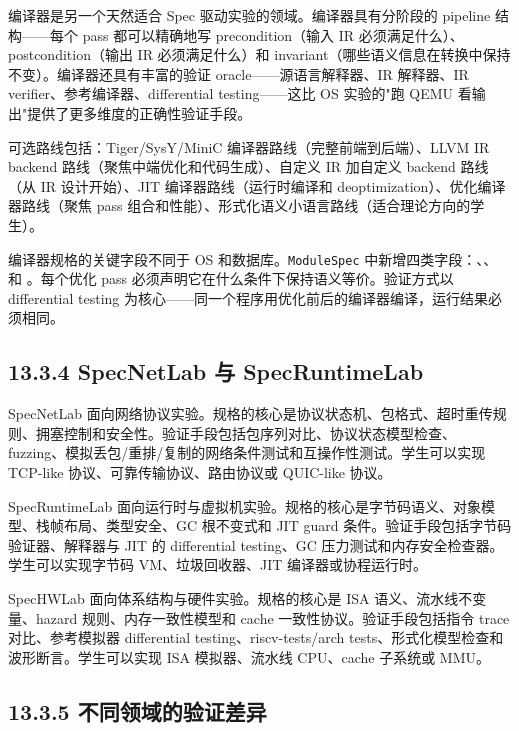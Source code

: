 \documentclass[UTF8,a4paper,12pt,openany]{ctexrep}
\begin{document}
编译器是另一个天然适合 Spec 驱动实验的领域。编译器具有分阶段的 pipeline 结构------每个 pass 都可以精确地写 precondition（输入 IR 必须满足什么）、postcondition（输出 IR 必须满足什么）和 invariant（哪些语义信息在转换中保持不变）。编译器还具有丰富的验证 oracle------源语言解释器、IR 解释器、IR verifier、参考编译器、differential testing------这比 OS 实验的"跑 QEMU 看输出"提供了更多维度的正确性验证手段。

可选路线包括：Tiger/SysY/MiniC 编译器路线（完整前端到后端）、LLVM IR backend 路线（聚焦中端优化和代码生成）、自定义 IR 加自定义 backend 路线（从 IR 设计开始）、JIT 编译器路线（运行时编译和 deoptimization）、优化编译器路线（聚焦 pass 组合和性能）、形式化语义小语言路线（适合理论方向的学生）。

编译器规格的关键字段不同于 OS 和数据库。\texttt{ModuleSpec} 中新增四类字段：、、 和 。每个优化 pass 必须声明它在什么条件下保持语义等价。验证方式以 differential testing 为核心------同一个程序用优化前后的编译器编译，运行结果必须相同。

\subsection{13.3.4 SpecNetLab 与 SpecRuntimeLab}\label{1334-specnetlab-ux4e0e-specruntimelab}

SpecNetLab 面向网络协议实验。规格的核心是协议状态机、包格式、超时重传规则、拥塞控制和安全性。验证手段包括包序列对比、协议状态模型检查、fuzzing、模拟丢包/重排/复制的网络条件测试和互操作性测试。学生可以实现 TCP-like 协议、可靠传输协议、路由协议或 QUIC-like 协议。

SpecRuntimeLab 面向运行时与虚拟机实验。规格的核心是字节码语义、对象模型、栈帧布局、类型安全、GC 根不变式和 JIT guard 条件。验证手段包括字节码验证器、解释器与 JIT 的 differential testing、GC 压力测试和内存安全检查器。学生可以实现字节码 VM、垃圾回收器、JIT 编译器或协程运行时。

SpecHWLab 面向体系结构与硬件实验。规格的核心是 ISA 语义、流水线不变量、hazard 规则、内存一致性模型和 cache 一致性协议。验证手段包括指令 trace 对比、参考模拟器 differential testing、riscv-tests/arch tests、形式化模型检查和波形断言。学生可以实现 ISA 模拟器、流水线 CPU、cache 子系统或 MMU。

\subsection{13.3.5 不同领域的验证差异}\label{1335-ux4e0dux540cux9886ux57dfux7684ux9a8cux8bc1ux5deeux5f02}
\end{document}
